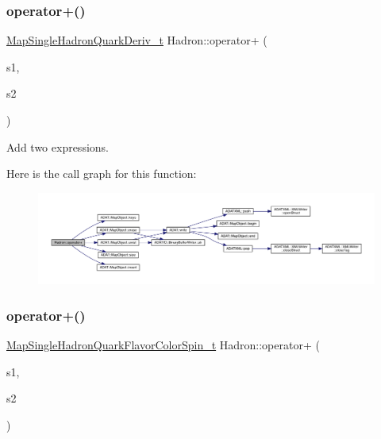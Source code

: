 \subsubsection{\texorpdfstring{operator+()}{operator+()}\hspace{0.1cm}{\footnotesize\ttfamily [2/3]}}
{\footnotesize\ttfamily \mbox{\hyperlink{namespaceHadron_aa588220689caea8a6aad4d0296526e6b}{Map\+Single\+Hadron\+Quark\+Deriv\+\_\+t}} Hadron\+::operator+ (\begin{DoxyParamCaption}\item[{const \mbox{\hyperlink{namespaceHadron_aa588220689caea8a6aad4d0296526e6b}{Map\+Single\+Hadron\+Quark\+Deriv\+\_\+t}} \&}]{s1,  }\item[{const \mbox{\hyperlink{namespaceHadron_aa588220689caea8a6aad4d0296526e6b}{Map\+Single\+Hadron\+Quark\+Deriv\+\_\+t}} \&}]{s2 }\end{DoxyParamCaption})}



Add two expressions. 

Here is the call graph for this function\+:
\nopagebreak
\begin{figure}[H]
\begin{center}
\leavevmode
\includegraphics[width=350pt]{d1/daf/namespaceHadron_afa83538fb097946f87e6f98180c378b5_cgraph}
\end{center}
\end{figure}
\mbox{\label{namespaceHadron_a168571d9c710321169dad756440c1952}} 
\subsubsection{\texorpdfstring{operator+()}{operator+()}\hspace{0.1cm}{\footnotesize\ttfamily [3/3]}}
{\footnotesize\ttfamily \mbox{\hyperlink{namespaceHadron_a03b319764f85c20434f20a269ce5f388}{Map\+Single\+Hadron\+Quark\+Flavor\+Color\+Spin\+\_\+t}} Hadron\+::operator+ (\begin{DoxyParamCaption}\item[{const \mbox{\hyperlink{namespaceHadron_a03b319764f85c20434f20a269ce5f388}{Map\+Single\+Hadron\+Quark\+Flavor\+Color\+Spin\+\_\+t}} \&}]{s1,  }\item[{const \mbox{\hyperlink{namespaceHadron_a03b319764f85c20434f20a269ce5f388}{Map\+Single\+Hadron\+Quark\+Flavor\+Color\+Spin\+\_\+t}} \&}]{s2 }\end{DoxyParamCaption})}



